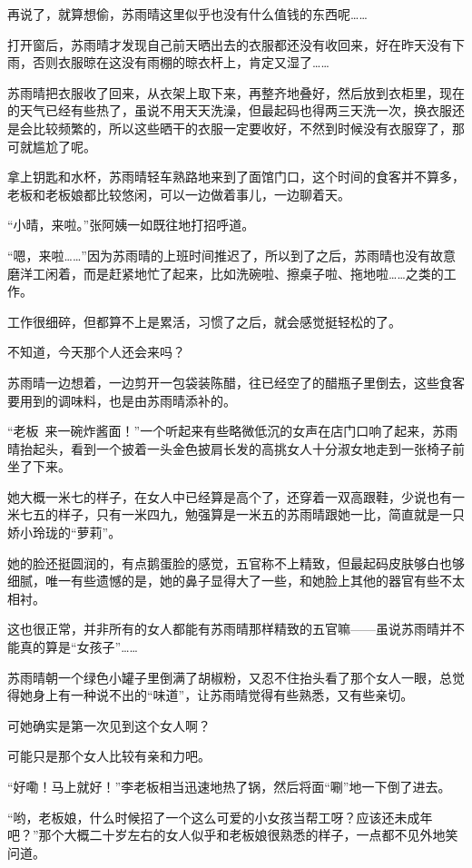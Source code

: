 再说了，就算想偷，苏雨晴这里似乎也没有什么值钱的东西呢……

打开窗后，苏雨晴才发现自己前天晒出去的衣服都还没有收回来，好在昨天没有下雨，否则衣服晾在这没有雨棚的晾衣杆上，肯定又湿了……

苏雨晴把衣服收了回来，从衣架上取下来，再整齐地叠好，然后放到衣柜里，现在的天气已经有些热了，虽说不用天天洗澡，但最起码也得两三天洗一次，换衣服还是会比较频繁的，所以这些晒干的衣服一定要收好，不然到时候没有衣服穿了，那可就尴尬了呢。

拿上钥匙和水杯，苏雨晴轻车熟路地来到了面馆门口，这个时间的食客并不算多，老板和老板娘都比较悠闲，可以一边做着事儿，一边聊着天。

“小晴，来啦。”张阿姨一如既往地打招呼道。

“嗯，来啦……”因为苏雨晴的上班时间推迟了，所以到了之后，苏雨晴也没有故意磨洋工闲着，而是赶紧地忙了起来，比如洗碗啦、擦桌子啦、拖地啦……之类的工作。

工作很细碎，但都算不上是累活，习惯了之后，就会感觉挺轻松的了。

不知道，今天那个人还会来吗？

苏雨晴一边想着，一边剪开一包袋装陈醋，往已经空了的醋瓶子里倒去，这些食客要用到的调味料，也是由苏雨晴添补的。

“老板~来一碗炸酱面！”一个听起来有些略微低沉的女声在店门口响了起来，苏雨晴抬起头，看到一个披着一头金色披肩长发的高挑女人十分淑女地走到一张椅子前坐了下来。

她大概一米七的样子，在女人中已经算是高个了，还穿着一双高跟鞋，少说也有一米七五的样子，只有一米四九，勉强算是一米五的苏雨晴跟她一比，简直就是一只娇小玲珑的“萝莉”。

她的脸还挺圆润的，有点鹅蛋脸的感觉，五官称不上精致，但最起码皮肤够白也够细腻，唯一有些遗憾的是，她的鼻子显得大了一些，和她脸上其他的器官有些不太相衬。

这也很正常，并非所有的女人都能有苏雨晴那样精致的五官嘛——虽说苏雨晴并不能真的算是“女孩子”……

苏雨晴朝一个绿色小罐子里倒满了胡椒粉，又忍不住抬头看了那个女人一眼，总觉得她身上有一种说不出的“味道”，让苏雨晴觉得有些熟悉，又有些亲切。

可她确实是第一次见到这个女人啊？

可能只是那个女人比较有亲和力吧。

“好嘞！马上就好！”李老板相当迅速地热了锅，然后将面“唰”地一下倒了进去。

“哟，老板娘，什么时候招了一个这么可爱的小女孩当帮工呀？应该还未成年吧？”那个大概二十岁左右的女人似乎和老板娘很熟悉的样子，一点都不见外地笑问道。

